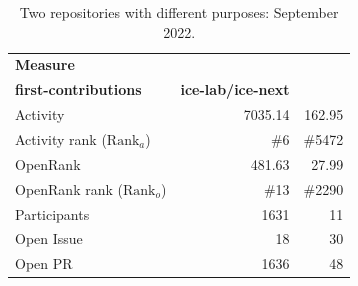 \begin{table}[tbp]
\caption{Two repositories with different purposes: September 2022.}
\label{tab:repo-purpose}
\begingroup\fontsize{9.3}{12}\selectfont
\renewcommand{\arraystretch}{1.14}
\begin{tabularx}{\textwidth}{@{}Xrr@{}}
\toprule
\textbf{Measure} & \shortstack[r]{\textbf{firstcontributions/}\\\textbf{first-contributions}} & \textbf{ice-lab/ice-next}\\
\midrule
Activity & 7035.14 & 162.95\\
Activity rank ($\mathrm{Rank}_a$) & \#6 & \#5472\\
OpenRank & 481.63 & 27.99\\
OpenRank rank ($\mathrm{Rank}_o$) & \#13 & \#2290\\
Participants & 1631 & 11\\
Open Issue & 18 & 30\\
Open PR & 1636 & 48\\
\bottomrule
\end{tabularx}\endgroup
{}
\end{table}
